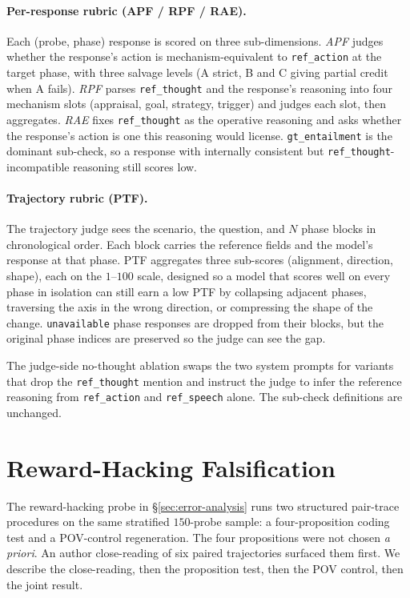 \documentclass[11pt]{article}
\begin{document}
\paragraph{Per-response rubric (APF / RPF / RAE).}
Each (probe, phase) response is scored on three sub-dimensions. \emph{APF} judges whether the response's action is mechanism-equivalent to \texttt{ref\_action} at the target phase, with three salvage levels (A strict, B and C giving partial credit when A fails). \emph{RPF} parses \texttt{ref\_thought} and the response's reasoning into four mechanism slots (appraisal, goal, strategy, trigger) and judges each slot, then aggregates. \emph{RAE} fixes \texttt{ref\_thought} as the operative reasoning and asks whether the response's action is one this reasoning would license. \texttt{gt\_entailment} is the dominant sub-check, so a response with internally consistent but \texttt{ref\_thought}-incompatible reasoning still scores low.

\paragraph{Trajectory rubric (PTF).}
The trajectory judge sees the scenario, the question, and $N$ phase blocks in chronological order. Each block carries the reference fields and the model's response at that phase. PTF aggregates three sub-scores (alignment, direction, shape), each on the $1$--$100$ scale, designed so a model that scores well on every phase in isolation can still earn a low PTF by collapsing adjacent phases, traversing the axis in the wrong direction, or compressing the shape of the change. \texttt{unavailable} phase responses are dropped from their blocks, but the original phase indices are preserved so the judge can see the gap.

The judge-side no-thought ablation swaps the two system prompts for variants that drop the \texttt{ref\_thought} mention and instruct the judge to infer the reference reasoning from \texttt{ref\_action} and \texttt{ref\_speech} alone. The sub-check definitions are unchanged.

\section{Reward-Hacking Falsification\label{app:pairwise-coding}}

The reward-hacking probe in \S\ref{sec:error-analysis} runs two structured pair-trace procedures on the same stratified $150$-probe sample: a four-proposition coding test and a POV-control regeneration. The four propositions were not chosen \emph{a priori}. An author close-reading of six paired trajectories surfaced them first. We describe the close-reading, then the proposition test, then the POV control, then the joint result.
\end{document}
